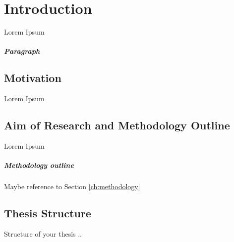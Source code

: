 
\chapter{Introduction}
\label{ch:introduction}

Lorem Ipsum


\paragraph{Paragraph} 



\section{Motivation}
\label{sec:motivation}

Lorem Ipsum



\section{Aim of Research and Methodology Outline}
\label{sec:goal}

Lorem Ipsum

\paragraph{Methodology outline} Maybe reference to Section \ref{ch:methodology}



\section{Thesis Structure}
\label{sec:structure}

Structure of your thesis ..

